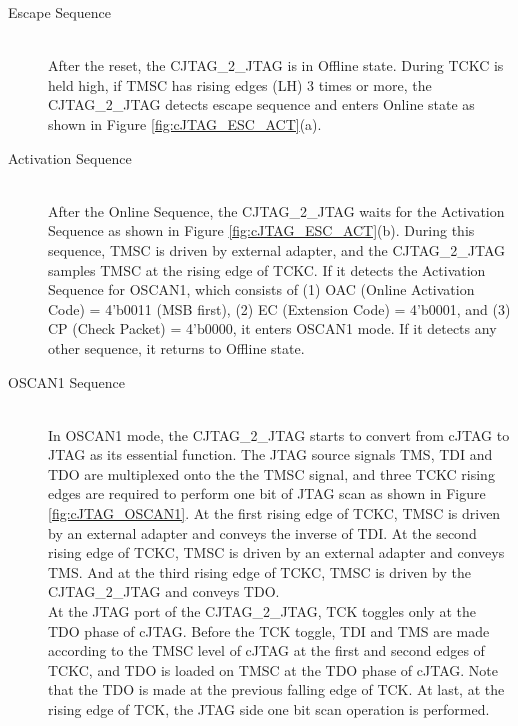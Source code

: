 \begin{description}

    \item[Escape Sequence]\mbox{}\\
        After the reset, the CJTAG\_2\_JTAG is in Offline state. During TCKC is held high, if TMSC has rising edges (L\textrightarrow H) 3 times or more, the CJTAG\_2\_JTAG detects escape sequence and enters Online state as shown in Figure \ref{fig:cJTAG_ESC_ACT}(a).

    \item[Activation Sequence]\mbox{}\\
        After the Online Sequence, the CJTAG\_2\_JTAG waits for the Activation Sequence as shown in Figure \ref{fig:cJTAG_ESC_ACT}(b). During this sequence, TMSC is driven by external adapter, and the CJTAG\_2\_JTAG samples TMSC at the rising edge of TCKC. If it detects the Activation Sequence for OSCAN1, which consists of (1) OAC (Online Activation Code) = 4'b0011 (MSB first), (2) EC (Extension Code) = 4'b0001, and (3) CP (Check Packet) = 4'b0000, it enters OSCAN1 mode. If it detects any other sequence, it returns to Offline state.       

    \item[OSCAN1 Sequence]\mbox{}\\
        In OSCAN1 mode, the CJTAG\_2\_JTAG starts to convert from cJTAG to JTAG as its essential function. The JTAG source signals TMS, TDI and TDO are multiplexed onto the the TMSC signal, and three TCKC rising edges are required to perform one bit of JTAG scan as shown in Figure \ref{fig:cJTAG_OSCAN1}. At the first rising edge of TCKC, TMSC is driven by an external adapter and conveys the inverse of TDI. At the second rising edge of TCKC, TMSC is driven by an external adapter and conveys TMS. And at the third rising edge of TCKC, TMSC is driven by the CJTAG\_2\_JTAG and conveys TDO.\\
        At the JTAG port of the CJTAG\_2\_JTAG, TCK toggles only at the TDO phase of cJTAG. Before the TCK toggle, TDI and TMS are made according to the TMSC level of cJTAG at the first and second edges of TCKC, and TDO is loaded on TMSC at the TDO phase of cJTAG. Note that the TDO is made at the previous falling edge of TCK. At last, at the rising edge of TCK, the JTAG side one bit scan operation is performed.

\end{description}

